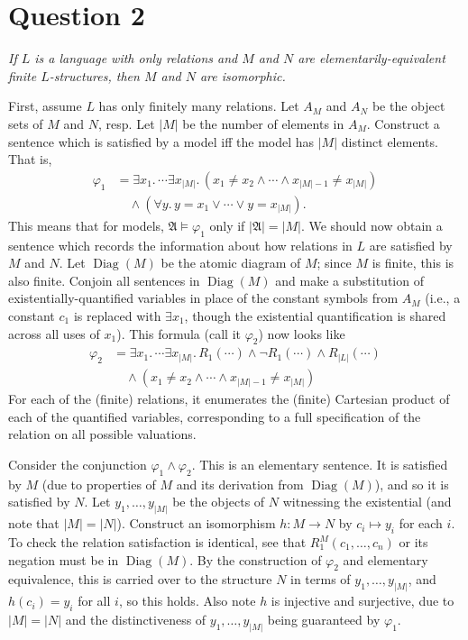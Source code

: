 \documentclass[a4paper]{article}
\DeclareMathOperator{\Diag}{Diag}
\begin{document}
\section*{Question 2}
\begin{center}
  \textit{If $L$ is a language with only relations and $M$ and $N$ are
  elementarily-equivalent finite $L$-structures, then $M$ and $N$ are isomorphic.}
\end{center}
First, assume $L$ has only finitely many relations.
Let $A_M$ and $A_N$ be the object sets of $M$ and $N$, resp.
Let $|M|$ be the number of elements in $A_M$.
Construct a sentence which is satisfied by a model
iff the model has $|M|$ distinct elements. That is,
\begin{align*}
  \varphi_{1} &= \exists x_1.\,\cdots\exists x_{|M|}.\,
  (x_1 \ne x_2 \wedge \cdots \wedge x_{|M|-1} \ne x_{|M|})\\
              &\quad\wedge (\forall y.\, y = x_1 \vee \cdots\vee y = x_{|M|}).
\end{align*}
This means that for models,
$\mathfrak A \models \varphi_1$ only if $|\mathfrak A| = |M|$.
We should now obtain a sentence which records the information about
how relations in $L$ are satisfied by $M$ and $N$.
Let $\Diag(M)$ be the atomic diagram of $M$;
since $M$ is finite, this is also finite.
Conjoin all sentences in $\Diag(M)$ and make a substitution
of existentially-quantified variables in place
of the constant symbols from $A_M$ (i.e.,
a constant $c_1$ is replaced with $\exists x_1$, though the existential
quantification is shared across all uses of $x_1$).
This formula  (call it $\varphi_2$) now looks like
\begin{align*}
  \varphi_2  &= 
\exists x_1.\,\cdots\exists x_{|M|}.\,
R_1(\cdots) \wedge \neg R_1(\cdots)\wedge R_{|L|}(\cdots) \\
             &\quad\wedge(x_1 \ne x_2 \wedge \cdots \wedge x_{|M|-1} \ne x_{|M|})
\end{align*}
For each of the (finite) relations, it enumerates the (finite) 
Cartesian product of each of the quantified variables,
corresponding to a full specification of the relation on all possible
valuations.

Consider the conjunction $\varphi_1 \wedge \varphi_2$.
This is an elementary sentence.
It is satisfied by $M$ (due to properties of $M$ and its derivation from $\Diag(M)$),
and so it is satisfied by $N$.
Let $y_1, \ldots, y_{|M|}$ be the objects of $N$ witnessing the existential
(and note that $|M| = |N|$).
Construct an isomorphism $h : M \to N$ by $c_i \mapsto y_i$ for each $i$.
To check the relation satisfaction is identical, see that
$R_1^M(c_1, \ldots, c_n)$
or its negation must be in $\Diag(M)$.
By the construction of $\varphi_2$ and elementary equivalence, this is carried over
to the structure $N$ in terms of $y_1, \ldots, y_{|M|}$,
and $h(c_i) = y_i$ for all $i$, so this holds.
Also note $h$ is injective and surjective, due to $|M| = |N|$
and the distinctiveness of $y_1, \ldots, y_{|M|}$ being guaranteed by
$\varphi_1$.
\end{document}
